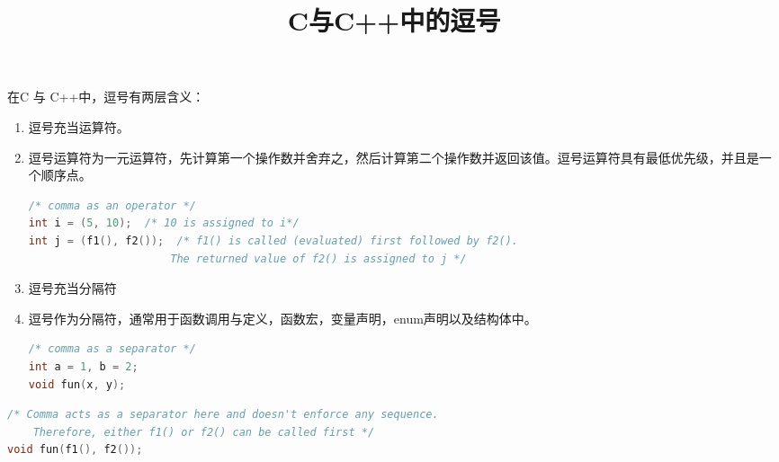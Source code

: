 \documentclass[10pt,a4paper%
tablecaptionabove]{article}
\begin{document}
\begin{CJK}{UTF8}{gkai}
 

\newtheorem{li}{例}
\newtheorem{jielun}{结论}
\newtheorem{dingli}{定理}
\newtheorem{mingti}{{命题}} 
\newtheorem{yinli}{{引理}} 
\newtheorem{tuilun}{{推论}}
\newtheorem{dingyi}{{定义}} 
\newtheorem{example}{{例}}
\newtheorem*{example*}{{例}}
\newtheorem*{jie}{{解}}
\newtheorem*{zhengming}{{证明}}
\newtheorem{zhu}{{注}}
\newtheorem*{zhu*}{{注}}
\newtheorem{xingzhi}{{性质}}
\newtheorem{wenti}{{问题}}
\newtheorem{rem}{{Remark}}
\newtheorem{lem}{{Lemma}}
\pagestyle{plain}


\title{C与C++中的逗号}
\maketitle

在C 与 C++中，逗号有两层含义：
\begin{enumerate}
\item 逗号充当运算符。
\item[] 逗号运算符为一元运算符，先计算第一个操作数并舍弃之，然后计算第二个操作数并返回该值。逗号运算符具有最低优先级，并且是一个顺序点。
  \begin{lstlisting}[language=c,backgroundcolor=\color{red!10}]
/* comma as an operator */
int i = (5, 10);  /* 10 is assigned to i*/
int j = (f1(), f2());  /* f1() is called (evaluated) first followed by f2(). 
                      The returned value of f2() is assigned to j */    
  \end{lstlisting}
\item 逗号充当分隔符
\item[] 逗号作为分隔符，通常用于函数调用与定义，函数宏，变量声明，enum声明以及结构体中。
  \begin{lstlisting}[language=c,backgroundcolor=\color{red!10}]
/* comma as a separator */
int a = 1, b = 2;
void fun(x, y);    
  \end{lstlisting}
\end{enumerate}


\begin{lstlisting}[language=c,backgroundcolor=\color{red!10}]
/* Comma acts as a separator here and doesn't enforce any sequence. 
    Therefore, either f1() or f2() can be called first */
void fun(f1(), f2());  
\end{lstlisting}





\end{CJK}
\end{document}
